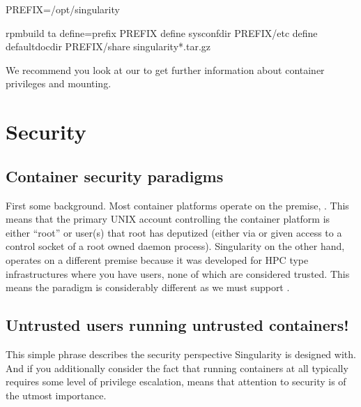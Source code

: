\documentclass[letterpaper,10pt,english]{sphinxmanual}
\begin{document}
%
\begin{sphinxVerbatim}[commandchars=\\\{\}]
\PYGZdl{} PREFIX=/opt/singularity

\PYGZdl{} rpmbuild \PYGZhy{}ta \PYGZhy{}\PYGZhy{}define=\PYGZdq{}\PYGZus{}prefix \PYGZdl{}PREFIX\PYGZdq{} \PYGZhy{}\PYGZhy{}define \PYGZdq{}\PYGZus{}sysconfdir \PYGZdl{}PREFIX/etc\PYGZdq{} \PYGZhy{}\PYGZhy{}define \PYGZdq{}\PYGZus{}defaultdocdir \PYGZdl{}PREFIX/share\PYGZdq{} singularity\PYGZhy{}*.tar.gz
\end{sphinxVerbatim}

We recommend you look at our {\hyperref[\detokenize{security:security}]{}} to get further information about container
privileges and mounting.


\chapter{Security}
\label{\detokenize{security:security}}\label{\detokenize{security:id1}}\label{\detokenize{security::doc}}

\section{Container security paradigms}
\label{\detokenize{security:container-security-paradigms}}
First some background. Most container platforms operate on the
premise, . This means that
the primary UNIX account controlling the container platform is either
“root” or user(s) that root has deputized (either via  or given access
to a control socket of a root owned daemon process).
Singularity on the other hand, operates on a different premise because
it was developed for HPC type infrastructures where you have users,
none of which are considered trusted. This means the paradigm is
considerably different as we must support .


\section{Untrusted users running untrusted containers!}
\label{\detokenize{security:untrusted-users-running-untrusted-containers}}
This simple phrase describes the security perspective Singularity is
designed with. And if you additionally consider the fact that running
containers at all typically requires some level of privilege
escalation, means that attention to security is of the utmost
importance.
\end{document}
